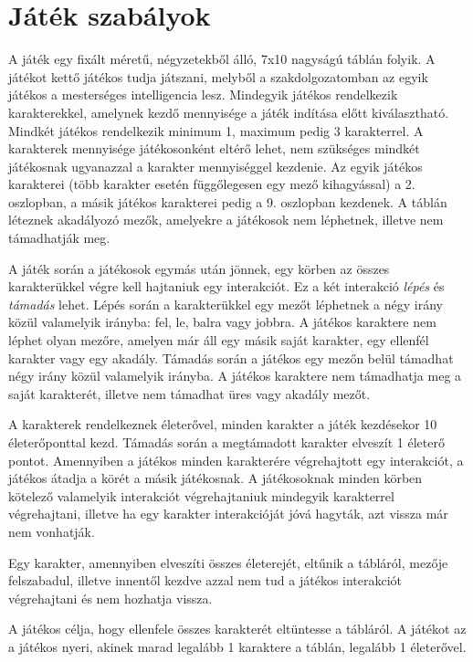 \documentclass[
]{thesis-ekf}
\theoremstyle{definition}
\theoremstyle{remark}
\begin{document}
\section{Játék szabályok} \label{rules}

A játék egy fixált méretű, négyzetekből álló, 7x10 nagyságú táblán folyik. A játékot kettő játékos tudja játszani, melyből a szakdolgozatomban az egyik játékos a mesterséges intelligencia lesz. Mindegyik játékos rendelkezik karakterekkel, amelynek kezdő mennyisége a játék indítása előtt kiválasztható. Mindkét játékos rendelkezik minimum 1, maximum pedig 3 karakterrel. A karakterek mennyisége játékosonként eltérő lehet, nem szükséges mindkét játékosnak ugyanazzal a karakter mennyiséggel kezdenie. Az egyik játékos karakterei (több karakter esetén függőlegesen egy mező kihagyással) a 2. oszlopban, a másik játékos karakterei pedig a 9. oszlopban kezdenek. A táblán léteznek akadályozó mezők, amelyekre a játékosok nem léphetnek, illetve nem támadhatják meg. 

A játék során a játékosok egymás után jönnek, egy körben az összes karakterükkel végre kell hajtaniuk egy interakciót. Ez a két interakció \emph{lépés} és \emph{támadás} lehet. Lépés során a karakterükkel egy mezőt léphetnek a négy irány közül valamelyik irányba: fel, le, balra vagy jobbra. A játékos karaktere nem léphet olyan mezőre, amelyen már áll egy másik saját karakter, egy ellenfél karakter vagy egy akadály. Támadás során a játékos egy mezőn belül támadhat négy irány közül valamelyik irányba. A játékos karaktere nem támadhatja meg a saját karakterét, illetve nem támadhat üres vagy akadály mezőt.

A karakterek rendelkeznek életerővel, minden karakter a játék kezdésekor 10 életerőponttal kezd. Támadás során a megtámadott karakter elveszít 1 életerő pontot. Amennyiben a játékos minden karakterére végrehajtott egy interakciót, a játékos átadja a körét a másik játékosnak. A játékosoknak minden körben kötelező valamelyik interakciót végrehajtaniuk mindegyik karakterrel végrehajtani, illetve ha egy karakter interakcióját jóvá hagyták, azt vissza már nem vonhatják.

Egy karakter, amennyiben elveszíti összes életerejét, eltűnik a tábláról, mezője felszabadul, illetve innentől kezdve azzal nem tud a játékos interakciót végrehajtani és nem hozhatja vissza.
 
A játékos célja, hogy ellenfele összes karakterét eltüntesse a tábláról. A játékot az a játékos nyeri, akinek marad legalább 1 karaktere a táblán, legalább 1 életerővel.
\end{document}
